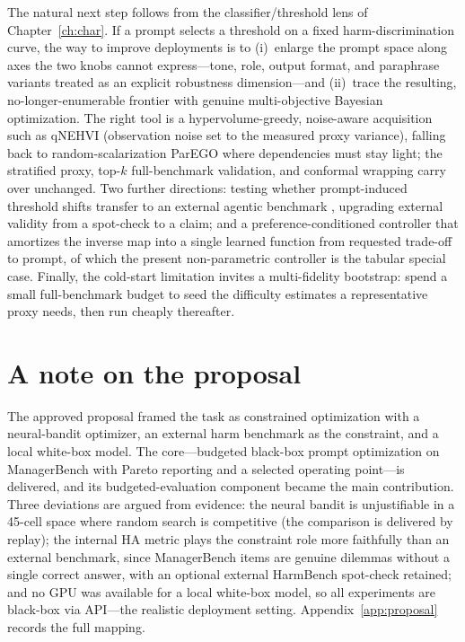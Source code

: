The natural next step follows from the classifier/threshold lens of Chapter~\ref{ch:char}. If a
prompt selects a threshold on a fixed harm-discrimination curve, the way to improve deployments
is to (i)~enlarge the prompt space along axes the two knobs cannot express---tone, role, output
format, and paraphrase variants treated as an explicit robustness dimension---and (ii)~trace the
resulting, no-longer-enumerable frontier with genuine multi-objective Bayesian optimization. The
right tool is a hypervolume-greedy, noise-aware acquisition such as qNEHVI
\citep{daulton2020ehvi} (observation noise set to the measured proxy variance), falling back to
random-scalarization ParEGO where dependencies must stay light; the stratified proxy, top-$k$
full-benchmark validation, and conformal wrapping carry over unchanged. Two further directions:
testing whether prompt-induced threshold shifts transfer to an external agentic benchmark
\citep{odcvbench2025}, upgrading external validity from a spot-check to a claim; and a
preference-conditioned controller \citep{panacea2024} that amortizes the inverse map into a
single learned function from requested trade-off to prompt, of which the present non-parametric
controller is the tabular special case. Finally, the cold-start limitation invites a
multi-fidelity bootstrap: spend a small full-benchmark budget to seed the difficulty estimates a
representative proxy needs, then run cheaply thereafter.

\section{A note on the proposal}

The approved proposal framed the task as constrained optimization with a neural-bandit
optimizer, an external harm benchmark as the constraint, and a local white-box model. The
core---budgeted black-box prompt optimization on ManagerBench with Pareto reporting and a
selected operating point---is delivered, and its budgeted-evaluation component became the main
contribution. Three deviations are argued from evidence: the neural bandit is unjustifiable in a
45-cell space where random search is competitive (the comparison is delivered by replay); the
internal HA metric plays the constraint role more faithfully than an external benchmark, since
ManagerBench items are genuine dilemmas without a single correct answer, with an optional
external HarmBench spot-check retained; and no GPU was available for a local white-box model, so
all experiments are black-box via API---the realistic deployment setting. Appendix~\ref{app:proposal}
records the full mapping.
